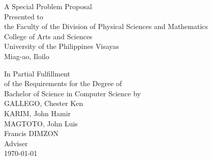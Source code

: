 \begin{titlepage}
\centering


\vspace{1.75cm}
A Special Problem Proposal\\
Presented to\\
the Faculty of the Division of Physical Sciences and Mathematics\\
College of Arts and Sciences\\
University of the Philippines Visayas\\
Miag-ao, Iloilo

\vspace{1.75cm}
In Partial Fulfillment\\
of the Requirements for the Degree of\\
Bachelor of Science in Computer Science
\vspace{1.75cm}
by\\

\vspace{1cm}
GALLEGO, Chester Ken  \\
KARIM, John Hamir  \\
MAGTOTO, John Luis  \\

\vspace{1.75cm}
Francis DIMZON \\
Adviser\\

\vspace{1.75cm}
\today
\end{titlepage}
